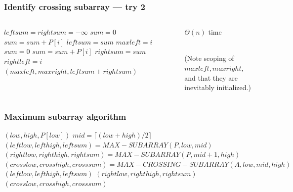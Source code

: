\documentclass{beamer}
\newcommand{\stanza}{ \\~\ }
\begin{document}
\begin{frame} \frametitle{Identify crossing subarray --- try 2}
\begin{columns}
\begin{column}{0.6\textwidth}
  {\tiny
  \begin{algorithmic}[1]
    \State $leftsum = rightsum = -\infty$
    \State $sum = 0$
      \State $sum = sum + P[i]$
        \State $leftsum = sum$
        \State $maxleft = i$
      \EndIf
    \EndFor
    \State $sum = 0$
      \State $sum = sum + P[i]$
        \State $rightsum = sum$
        \State $rightleft = i$
      \EndIf
    \EndFor
    \State \Return $(maxleft, maxright, leftsum + rightsum)$
    \EndFunction
  \end{algorithmic}
  }
\end{column}
\begin{column}{0.4\textwidth}
  $\Theta(n)$ time \stanza

  (Note scoping of $maxleft, maxright$, and that they are inevitably initialized.)
\end{column}
\end{columns}
\end{frame}

\begin{frame} \frametitle{Maximum subarray algorithm}
  {\tiny
  \begin{algorithmic}[1]
      \State \Return $(low, high, P[low])$
    \Else
      \State $mid = \lceil (low+high)/2 \rceil$
      \State $(leftlow, lefthigh, leftsum) = MAX-SUBARRAY(P, low, mid)$
      \State $(rightlow, righthigh, rightsum) = MAX-SUBARRAY(P, mid+1, high)$
      \State $(crosslow, crosshigh, crosssum) = MAX-CROSSING-SUBARRAY(A, low, mid, high)$
        \State \Return $(leftlow, lefthigh, leftsum)$ 
        \State \Return $(rightlow, righthigh, rightsum)$ 
      \Else
        \State \Return $(crosslow, crosshigh, crosssum)$ 
      \EndIf
    \EndIf
    \EndFunction
  \end{algorithmic}
  }
\end{frame}
\end{document}
